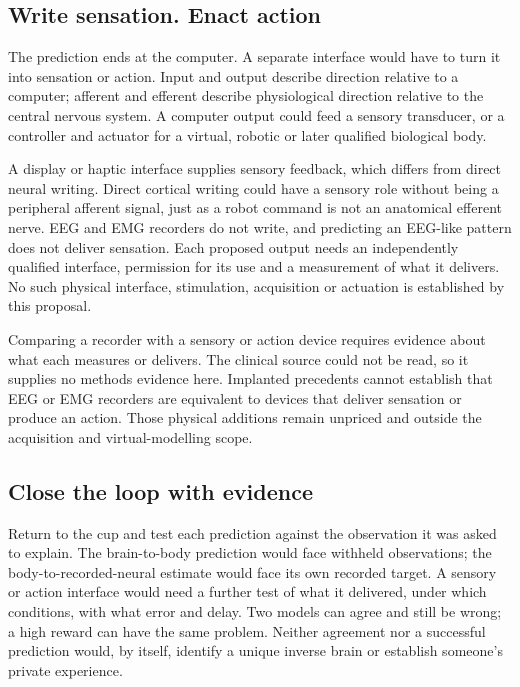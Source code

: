 \subsection{Write sensation. Enact action}
The prediction ends at the computer. A separate interface would have to turn
it into sensation or action. Input and output describe direction relative to
a computer; afferent and efferent describe physiological direction relative
to the central nervous system. A computer output could feed a sensory
transducer, or a controller and actuator for a virtual, robotic or later
qualified biological body.

A display or haptic interface supplies sensory feedback, which differs from direct neural writing. Direct cortical writing could have a sensory role without being a peripheral afferent signal, just as a robot command is not an anatomical efferent nerve. EEG and EMG recorders do not write, and predicting an EEG-like pattern does not deliver sensation. Each proposed output needs an independently qualified interface, permission for its use and a measurement of what it delivers. No such physical interface, stimulation, acquisition or actuation is established by this proposal.

Comparing a recorder with a sensory or action device requires evidence about what each measures or delivers. The clinical source could not be read, so it supplies no methods evidence here. Implanted precedents cannot establish that EEG or EMG recorders are equivalent to devices that deliver sensation or produce an action. Those physical additions remain unpriced and outside the acquisition and virtual-modelling scope.

\subsection{Close the loop with evidence}
Return to the cup and test each prediction against the observation it was
asked to explain. The brain-to-body prediction would face withheld observations;
the body-to-recorded-neural estimate would face its own recorded target.
A sensory or action interface would need a further test of what it delivered,
under which conditions, with what error and delay. Two models can agree and
still be wrong; a high reward can have the same problem. Neither agreement nor
a successful prediction would, by itself, identify a unique inverse brain or
establish someone's private experience.

